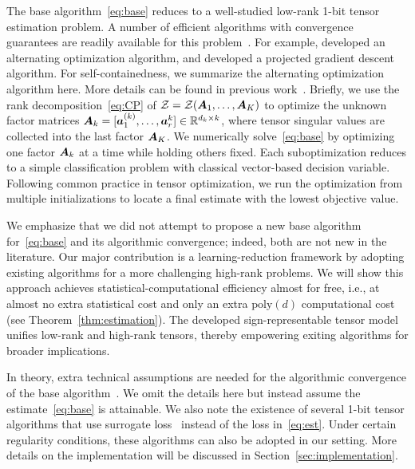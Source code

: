 \documentclass[twoside,11pt]{article}
\theoremstyle{definition}
\begin{document}
The base algorithm~\eqref{eq:base} reduces to a well-studied low-rank 1-bit tensor estimation problem. A number of efficient algorithms with convergence guarantees are readily available for this problem~\citep{ghadermarzy2018learning,wang2018learning,hong2020generalized,han2020optimal}. For example, \cite{wang2018learning} developed an alternating optimization algorithm, and \cite{han2020optimal} developed a projected gradient descent algorithm. For self-containedness, we summarize the alternating optimization algorithm here. More details can be found in previous work~\citep{wang2018learning,hong2020generalized}. Briefly, we use the rank decomposition~\eqref{eq:CP} of $\mathcal{Z}=\mathcal{Z}(\bm A_1,\ldots,\bm A_K)$ to optimize the unknown factor matrices $\bm A_k=[\bm{a}^{(k)}_1,\ldots,\bm{a}_r^{k}]\in\mathbb{R}^{d_k\times k}$, where tensor singular values are collected into the last factor $\bm A_K$. We numerically solve~\eqref{eq:base} by optimizing one factor $\bm A_k$ at a time while holding others fixed. Each suboptimization reduces to a simple classification problem with classical vector-based decision variable. Following common practice in tensor optimization, we run the optimization from multiple initializations to locate a final estimate with the lowest objective value. 

We emphasize that we did not attempt to propose a new base algorithm for~\eqref{eq:base} and its algorithmic convergence; indeed, both are not new in the literature. Our major contribution is a learning-reduction framework by adopting existing algorithms for a more challenging high-rank problems. We will show this approach achieves statistical-computational efficiency almost for free, i.e., at almost no extra statistical cost and only an extra $\text{poly}(d)$ computational cost (see Theorem~\ref{thm:estimation}). The developed sign-representable tensor model unifies low-rank and high-rank tensors, thereby empowering exiting algorithms for broader implications.

In theory, extra technical assumptions are needed for the algorithmic convergence of the base algorithm~\citep{wang2018learning,han2020optimal}. We omit the details here but instead assume the estimate~\eqref{eq:base} is attainable. We also note the existence of several 1-bit tensor algorithms that use surrogate loss~\citep{genzel2020robust,he2017kernelized} instead of the loss in~\eqref{eq:est}. Under certain regularity conditions, these algorithms can also be adopted in our setting. More details on the implementation will be discussed in Section~\ref{sec:implementation}. 
\end{document}
